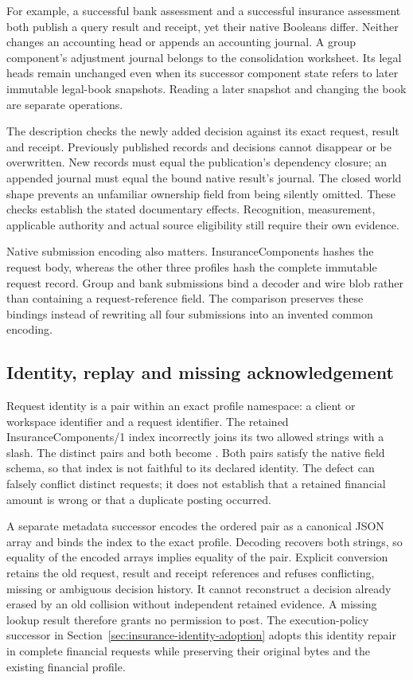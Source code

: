 For example, a successful bank assessment and a successful insurance assessment
both publish a query result and receipt, yet their native Booleans differ.
Neither changes an accounting head or appends an accounting journal. A group
component's adjustment journal belongs to the consolidation worksheet. Its
legal heads remain unchanged even when its successor component state refers to
later immutable legal-book snapshots. Reading a later snapshot and changing the
book are separate operations.

The description checks the newly added decision against its exact request,
result and receipt. Previously published records and decisions cannot disappear
or be overwritten. New records must equal the publication's dependency closure;
an appended journal must equal the bound native result's journal. The closed
world shape prevents an unfamiliar ownership field from being silently omitted.
These checks establish the stated documentary effects. Recognition,
measurement, applicable authority and actual source eligibility still require
their own evidence.

Native submission encoding also matters. InsuranceComponents hashes the request
body, whereas the other three profiles hash the complete immutable request
record. Group and bank submissions bind a decoder and wire blob rather than
containing a request-reference field. The comparison preserves these bindings
instead of rewriting all four submissions into an invented common encoding.

\subsection{Identity, replay and missing acknowledgement}

Request identity is a pair within an exact profile namespace: a client or
workspace identifier and a request identifier. The retained InsuranceComponents/1
index incorrectly joins its two allowed strings with a slash. The distinct pairs
 and  both become .
Both pairs satisfy the native field schema, so that index is not faithful to its
declared identity. The defect can falsely conflict distinct requests; it does
not establish that a retained financial amount is wrong or that a duplicate
posting occurred.

A separate metadata successor encodes the ordered pair as a canonical JSON
array and binds the index to the exact profile. Decoding recovers both strings,
so equality of the encoded arrays implies equality of the pair. Explicit
conversion retains the old request, result and receipt references and refuses
conflicting, missing or ambiguous decision history. It cannot reconstruct a
decision already erased by an old collision without independent retained
evidence. A missing lookup result therefore grants no permission to post.
The execution-policy successor in Section~\ref{sec:insurance-identity-adoption}
adopts this identity repair in complete financial requests while preserving
their original bytes and the existing financial profile.

